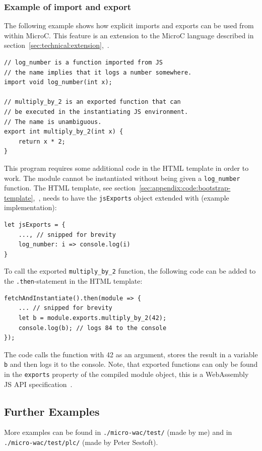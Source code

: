 \documentclass[a4paper]{article}
\begin{document}
\subsubsection{Example of import and export}
The following example shows how explicit imports and exports can be used from within MicroC. This feature is an extension to the MicroC language described in section~\ref{sec:technical:extension},~.

\begin{verbatim}
// log_number is a function imported from JS
// the name implies that it logs a number somewhere.
import void log_number(int x);

// multiply_by_2 is an exported function that can
// be executed in the instantiating JS environment.
// The name is unambiguous.
export int multiply_by_2(int x) {
	return x * 2;
}
\end{verbatim}

This program requires some additional code in the HTML template in order to work. The module cannot be instantiated without being given a \texttt{log\_number} function. The HTML template, see section~\ref{sec:appendix:code:bootstrap-template},~, needs to have the \texttt{jsExports} object extended with (example implementation):
\begin{verbatim}
let jsExports = {
	..., // snipped for brevity
	log_number: i => console.log(i)
}
\end{verbatim}

To call the exported \texttt{multiply\_by\_2} function, the following code can be added to the \texttt{.then}-statement in the HTML template:
\begin{verbatim}
fetchAndInstantiate().then(module => {
	... // snipped for brevity
	let b = module.exports.multiply_by_2(42);
	console.log(b); // logs 84 to the console
});
\end{verbatim}
The code calls the function with 42 as an argument, stores the result in a variable \texttt{b} and then logs it to the console. Note, that exported functions can only be found in the \texttt{exports} property of the compiled module object, this is a WebAssembly JS API specification~\cite{website:wasm-javascript-api}.

\subsection{Further Examples}
More examples can be found in \texttt{./micro-wac/test/} (made by me) and in \texttt{./micro-wac/test/plc/} (made by Peter Sestoft).
\end{document}
